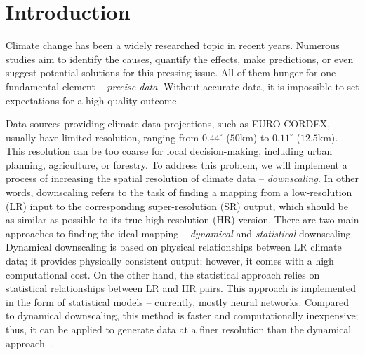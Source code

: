 \chapter*{Introduction}
\label{ch:introduction}
\setcounter{page}{1}


Climate change has been a widely researched topic in recent years.
Numerous studies aim to identify the causes, quantify the effects, make predictions, or even suggest potential solutions for this pressing issue.
All of them hunger for one fundamental element -- \textit{precise data}.
Without accurate data, it is impossible to set expectations for a high-quality outcome.

Data sources providing climate data projections, such as EURO-CORDEX, usually have limited resolution, ranging from $0.44^\circ$ ($50$km) to $0.11^\circ$ ($12.5$km).
This resolution can be too coarse for local decision-making, including urban planning, agriculture, or forestry.
To address this problem, we will implement a process of increasing the spatial resolution of climate data -- \textit{downscaling}.
In other words, downscaling refers to the task of finding a mapping from a low-resolution (LR) input to the corresponding super-resolution (SR) output, which should be as similar as possible to its true high-resolution (HR) version.
There are two main approaches to finding the ideal mapping -- \textit{dynamical} and \textit{statistical} downscaling.
Dynamical downscaling is based on physical relationships between LR climate data; it provides physically consistent output; however, it comes with a high computational cost.
On the other hand, the statistical approach relies on statistical relationships between LR and HR pairs.
This approach is implemented in the form of statistical models -- currently, mostly neural networks.
Compared to dynamical downscaling, this method is faster and computationally inexpensive; thus, it can be applied to generate data at a finer resolution than the dynamical approach~\cite{Tabari2021}.

